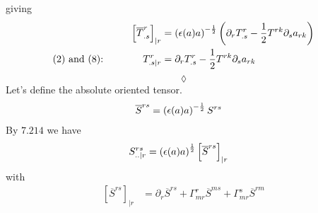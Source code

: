 giving
\begin{align}
\left[\overline{T}^r_{.s} \right]_{|r}&=\left(\epsilon (a) a\right)^{-\frac{1}{2}}\left(\partial_r T^r_{.s} - \frac{1}{2} T^{rk}\partial_s a_{rk}\right)\\
\text{(2) and (8):} \quad\quad\quad\quad T^r_{.s|r}&= \partial_r T^r_{.s} - \frac{1}{2} T^{rk}\partial_s a_{rk}
\end{align}
$$\lozenge$$
Let's define the absolute oriented tensor.
\begin{align}
\overline{S}^{rs} &= \left(\epsilon (a) a\right)^{-\frac{1}{2}}S^{rs}
\end{align}
By $\mathbf{7.214}$ we have
\begin{align}
S^{rs}_{..|r}&= \left(\epsilon (a) a \right)^{\frac{1}{2}}\left[\overline{S}^{rs} \right]_{|r}
\end{align}
with 
\begin{align}
\left[\overline{S}^{rs} \right]_{|r}&= \partial_r \overline{S}^{rs}  + \Gamma^r_{mr}\overline{S}^{ms} + \Gamma^s_{mr}\overline{S}^{rm}
\end{align}

